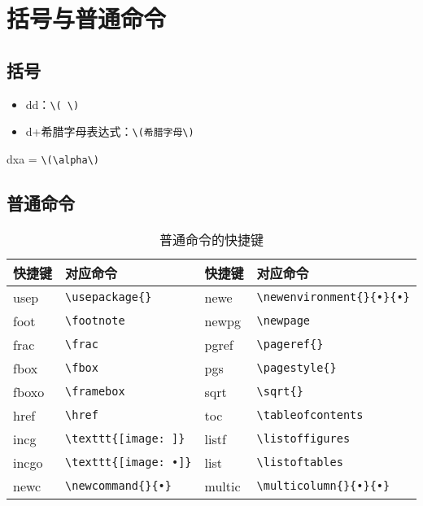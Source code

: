 \documentclass[blue,cn,normal,11pt]{elegantnote}
\begin{document}
\section{括号与普通命令}

\subsection{括号}

\begin{itemize}
\item dd：\lstinline{\( \)}
\item d+希腊字母表达式：\lstinline{\(希腊字母\)}
\end{itemize}

\begin{example}
dxa = \lstinline{\(\alpha\)}
\end{example}


\subsection{普通命令}
\begin{table}[htbp]
  \centering
  \caption{普通命令的快捷键}
    \begin{tabular}{p{3.04em}lp{3.5em}l}
    \toprule
    快捷键 & 对应命令  & 快捷键 & 对应命令 \\
    \midrule
    usep    & \lstinline|\usepackage{}| & newe   & \lstinline|\newenvironment{}{•}{•}| \\
    foot     & \lstinline|\footnote| & newpg  & \lstinline|\newpage| \\
    frac     & \lstinline|\frac| & pgref   & \lstinline|\pageref{}| \\
    fbox    & \lstinline|\fbox| & pgs    & \lstinline|\pagestyle{}| \\
    fboxo   & \lstinline|\framebox| & sqrt    & \lstinline|\sqrt{}| \\
    href    & \lstinline|\href| & toc    & \lstinline|\tableofcontents| \\
    incg    & \lstinline|\texttt{[image: ]}| & listf    & \lstinline|\listoffigures| \\
    incgo   & \lstinline|\texttt{[image: •]}| & list    & \lstinline|\listoftables| \\
    newc   & \lstinline|\newcommand{}{•}| & multic  & \lstinline|\multicolumn{}{•}{•}| \\
    \bottomrule
    \end{tabular}%
  \label{tab:normal command}%
\end{table}%
\end{document}
